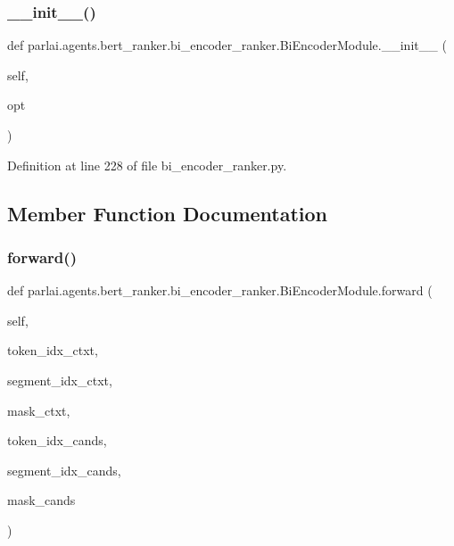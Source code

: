 \subsubsection{\texorpdfstring{\+\_\+\+\_\+init\+\_\+\+\_\+()}{\_\_init\_\_()}}
{\footnotesize\ttfamily def parlai.\+agents.\+bert\+\_\+ranker.\+bi\+\_\+encoder\+\_\+ranker.\+Bi\+Encoder\+Module.\+\_\+\+\_\+init\+\_\+\+\_\+ (\begin{DoxyParamCaption}\item[{}]{self,  }\item[{}]{opt }\end{DoxyParamCaption})}



Definition at line 228 of file bi\+\_\+encoder\+\_\+ranker.\+py.



\subsection{Member Function Documentation}
\mbox{\label{classparlai_1_1agents_1_1bert__ranker_1_1bi__encoder__ranker_1_1BiEncoderModule_a74b6c842e6e99d8a86f669e385ae48e9}} 
\subsubsection{\texorpdfstring{forward()}{forward()}}
{\footnotesize\ttfamily def parlai.\+agents.\+bert\+\_\+ranker.\+bi\+\_\+encoder\+\_\+ranker.\+Bi\+Encoder\+Module.\+forward (\begin{DoxyParamCaption}\item[{}]{self,  }\item[{}]{token\+\_\+idx\+\_\+ctxt,  }\item[{}]{segment\+\_\+idx\+\_\+ctxt,  }\item[{}]{mask\+\_\+ctxt,  }\item[{}]{token\+\_\+idx\+\_\+cands,  }\item[{}]{segment\+\_\+idx\+\_\+cands,  }\item[{}]{mask\+\_\+cands }\end{DoxyParamCaption})}



